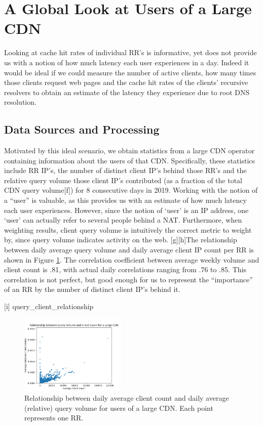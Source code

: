 \documentclass[sigconf,nonacm,10pt]{acmart}
\begin{document}
\section{A Global Look at Users of a Large
CDN}\label{a-global-look-at-users-of-a-large-cdn-1}

Looking at cache hit rates of individual RR's is informative, yet does
not provide us with a notion of how much latency each user experiences
in a day. Indeed it would be ideal if we could measure the number of
active clients, how many times those clients request web pages and the
cache hit rates of the clients' recursive resolvers to obtain an
estimate of the latency they experience due to root DNS resolution.

\subsection{Data Sources and
Processing}\label{data-sources-and-processing-1}

Motivated by this ideal scenario, we obtain statistics from a large CDN
operator containing information about the users of that CDN.
Specifically, these statistics include RR IP's, the number of distinct
client IP's behind those RR's and the relative query volume those client
IP's contributed (as a fraction of the total CDN query volume{[}f{]})
for 8 consecutive days in 2019. Working with the notion of a ``user'' is
valuable, as this provides us with an estimate of how much latency each
user experiences. However, since the notion of `user' is an IP address,
one `user' can actually refer to several people behind a NAT.
Furthermore, when weighting results, client query volume is intuitively
the correct metric to weight by, since query volume indicates activity
on the web. {[}g{]}{[}h{]}The relationship between daily average query
volume and daily average client IP count per RR is shown in Figure
\ref{fig:query_client_relationship}. The correlation coefficient between
average weekly volume and client count is .81, with actual daily
correlations ranging from .76 to .85. This correlation is not perfect,
but good enough for us to represent the ``importance'' of an RR by the
number of distinct client IP's behind it.

{[}i{]} query\_client\_relationship

\begin{figure}
    \centering
    \includegraphics[width=0.45\textwidth]{figures/query_client_relationship.png}
    \caption{Relationship between daily average client count and daily average (relative) query volume for users of a large CDN. Each point represents one RR.}
    \label{fig:query_client_relationship}
\end{figure}
\end{document}
